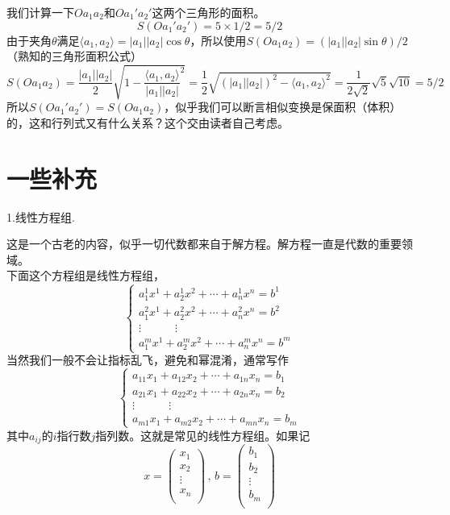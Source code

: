 \documentclass[11pt,a4paper,openany]{book}%
\theoremstyle{plain}%
\begin{document}
我们计算一下$Oa_1a_2$和$Oa_1'a_2'$这两个三角形的面积。
\[
S(Oa_1'a_2')=5\times1/2=5/2
\]
由于夹角$\theta$满足$\langle a_1,a_2 \rangle=|a_1||a_2|\cos\theta$，所以使用$S(Oa_1a_2)=(|a_1||a_2|\sin\theta)/2$（熟知的三角形面积公式）
\[
S(Oa_1a_2)=\frac{|a_1||a_2|}{2}\sqrt{1-\frac{\langle a_1,a_2 \rangle}{|a_1||a_2|}^2}=\frac{1}{2}\sqrt{(|a_1||a_2|)^2-\langle a_1,a_2 \rangle^2}=\frac{1}{2\sqrt{2}}\sqrt{5}\sqrt{10}=5/2
\]
所以$S(Oa_1'a_2')=S(Oa_1a_2)$，似乎我们可以断言相似变换是保面积（体积）的，这和行列式又有什么关系？这个交由读者自己考虑。

\section{一些补充}
\noindent 1.线性方程组.

这是一个古老的内容，似乎一切代数都来自于解方程。解方程一直是代数的重要领域。\\
\indent 下面这个方程组是线性方程组，
\[
\begin{cases}
a_1^1 x^{1} + a_2^1 x^{2} + \cdots + a_n^1 x^{n}=  b^{1} \\
a_1^2 x^{1} + a_2^2x^{2} + \cdots + a_n^2 x^{n}=  b^{2} \\
\vdots \quad \quad \quad \vdots \\
a_1^m x^{1} + a_2^m x^{2} + \cdots + a_n^m x^{n}=  b^{m} 
\end{cases}
\]
当然我们一般不会让指标乱飞，避免和幂混淆，通常写作
\[
\begin{cases}
a_{11}x_{1} + a_{12}x_{2} + \cdots + a_{1n}x_{n}=  b_{1} \\
a_{21}x_{1} + a_{22}x_{2} + \cdots + a_{2n}x_{n}=  b_{2} \\
 \vdots \quad \quad \quad \vdots \\
a_{m1}x_{1} + a_{m2}x_{2} + \cdots + a_{mn}x_{n}=  b_{m} 
\end{cases}
\]
其中$a_{ij}$的$i$指行数$j$指列数。这就是常见的线性方程组。如果记
\[
x=\begin{pmatrix}
x_{1}\\
x_{2}\\
\vdots \\
x_{n}\\
\end{pmatrix}
\,,\,
b=\begin{pmatrix}
b_{1}\\
b_{2}\\
\vdots \\
b_{m}\\
\end{pmatrix}
\]
\end{document}
